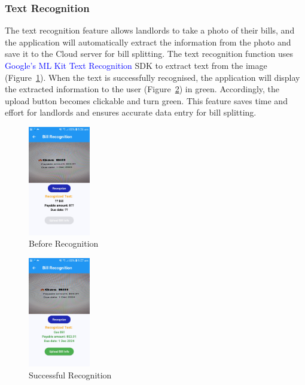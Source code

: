 \documentclass[sigconf]{acmart}
\newcommand{\specialterm}[1]{\textcolor{blue}{#1}}
\begin{document}
\subsubsection{Text Recognition}
The text recognition feature allows landlords to take a photo of their bills, and the application will automatically extract the information from the photo and save it to the Cloud server for bill splitting. The text recognition function uses \specialterm{Google's ML Kit Text Recognition} SDK to extract text from the image (Figure~\ref{fig:beforeBillRecognition}). When the text is successfully recognised, the application will display the extracted information to the user (Figure~\ref{fig:billRecognitionDone}) in green. Accordingly, the upload button becomes clickable and turn green. This feature saves time and effort for landlords and ensures accurate data entry for bill splitting.

\begin{figure}[h]
  \centering
  \includegraphics[width=0.24\textwidth]{beforeBillRecognition.jpg}
  \caption{Before Recognition}
  \label{fig:beforeBillRecognition}
\end{figure}
\begin{figure}[h]
  \centering
  \includegraphics[width=0.24\textwidth]{billRecognitionDone.jpg}
  \caption{Successful Recognition}
  \label{fig:billRecognitionDone}
\end{figure}
\end{document}
